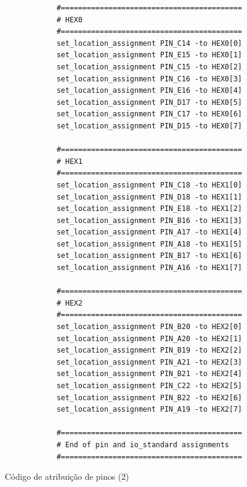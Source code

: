 \vspace*{\fill}
\begin{figure}[H]
    \footnotesize
    \centering
    \begin{minipage}{0.5\textwidth}
        \begin{verbatim}
            #==========================================
            # HEX0
            #==========================================
            set_location_assignment PIN_C14 -to HEX0[0]
            set_location_assignment PIN_E15 -to HEX0[1]
            set_location_assignment PIN_C15 -to HEX0[2]
            set_location_assignment PIN_C16 -to HEX0[3]
            set_location_assignment PIN_E16 -to HEX0[4]
            set_location_assignment PIN_D17 -to HEX0[5]
            set_location_assignment PIN_C17 -to HEX0[6]
            set_location_assignment PIN_D15 -to HEX0[7]

            #==========================================
            # HEX1
            #==========================================
            set_location_assignment PIN_C18 -to HEX1[0]
            set_location_assignment PIN_D18 -to HEX1[1]
            set_location_assignment PIN_E18 -to HEX1[2]
            set_location_assignment PIN_B16 -to HEX1[3]
            set_location_assignment PIN_A17 -to HEX1[4]
            set_location_assignment PIN_A18 -to HEX1[5]
            set_location_assignment PIN_B17 -to HEX1[6]
            set_location_assignment PIN_A16 -to HEX1[7]

            #==========================================
            # HEX2
            #==========================================
            set_location_assignment PIN_B20 -to HEX2[0]
            set_location_assignment PIN_A20 -to HEX2[1]
            set_location_assignment PIN_B19 -to HEX2[2]
            set_location_assignment PIN_A21 -to HEX2[3]
            set_location_assignment PIN_B21 -to HEX2[4]
            set_location_assignment PIN_C22 -to HEX2[5]
            set_location_assignment PIN_B22 -to HEX2[6]
            set_location_assignment PIN_A19 -to HEX2[7]

            #==========================================
            # End of pin and io_standard assignments
            #==========================================
        \end{verbatim}
    \end{minipage}
    \caption{Código de atribuição de pinos (2)}
\end{figure}
\vspace*{\fill}%